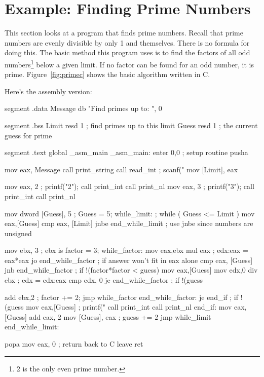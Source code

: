 \section{Example: Finding Prime Numbers}
This section looks at a program that finds prime numbers. Recall that
prime numbers are evenly divisible by only 1 and themselves. There is
no formula for doing this. The basic method this program uses is to
find the factors of all odd numbers\footnote{2 is the only even prime
number.} below a given limit. If no factor can be found for an odd
number, it is prime.  Figure~\ref{fig:primec} shows the basic
algorithm written in C.

Here's the assembly version:
\begin{AsmCodeListing}[label=prime.asm]
segment .data
Message         db      "Find primes up to: ", 0

segment .bss
Limit           resd    1               ; find primes up to this limit
Guess           resd    1               ; the current guess for prime

segment .text
        global  _asm_main
_asm_main:
        enter   0,0               ; setup routine
        pusha

        mov     eax, Message
        call    print_string
        call    read_int             ; scanf("%
        mov     [Limit], eax

        mov     eax, 2               ; printf("2\n");
        call    print_int
        call    print_nl
        mov     eax, 3               ; printf("3\n");
        call    print_int
        call    print_nl

        mov     dword [Guess], 5     ; Guess = 5;
while_limit:                         ; while ( Guess <= Limit )
        mov     eax,[Guess]
        cmp     eax, [Limit]
        jnbe    end_while_limit      ; use jnbe since numbers are unsigned

        mov     ebx, 3               ; ebx is factor = 3;
while_factor:
        mov     eax,ebx
        mul     eax                  ; edx:eax = eax*eax
        jo      end_while_factor     ; if answer won't fit in eax alone
        cmp     eax, [Guess]
        jnb     end_while_factor     ; if !(factor*factor < guess)
        mov     eax,[Guess]
        mov     edx,0
        div     ebx                  ; edx = edx:eax %
        cmp     edx, 0
        je      end_while_factor     ; if !(guess %

        add     ebx,2                ; factor += 2;
        jmp     while_factor
end_while_factor:
        je      end_if               ; if !(guess %
        mov     eax,[Guess]          ; printf("%
        call    print_int
        call    print_nl
end_if:
        mov     eax,[Guess]
        add     eax, 2
        mov     [Guess], eax         ; guess += 2
        jmp     while_limit
end_while_limit:

        popa
        mov     eax, 0            ; return back to C
        leave                     
        ret
\end{AsmCodeListing}

